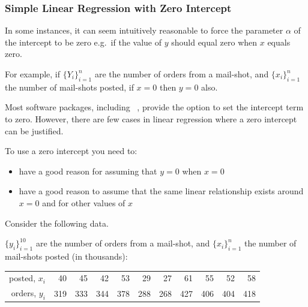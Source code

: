 \documentclass[12pt,a4paper,openany,twoside]{report}
\theoremstyle{definition}
\theoremstyle{remark}
\theoremstyle{plain}
\newcommand{\vsps}{\vspace{.5cm}}
\newcommand{\sR}[1]{\textbf{R}\,}
\theoremstyle{definition}
\theoremstyle{definition}
\theoremstyle{definition}
\theoremstyle{remark}
\let\BeginKnitrBlock\begin \let\EndKnitrBlock\end
\begin{document}
\hypertarget{simple-linear-regression-with-zero-intercept}{%
\subsubsection*{Simple Linear Regression with Zero Intercept}\label{simple-linear-regression-with-zero-intercept}}

In some instances, it can seem intuitively reasonable to force the
parameter \(\alpha\) of the intercept to be zero e.g.~if the value
of \(y\) should equal zero when \(x\) equals zero.

For example, if
\(\{ Y_{i}\}_{i = 1}^{n}\) are the number of orders from
a mail-shot, and \(\{ x_{i}\}_{i = 1}^{n}\) the number of
mail-shots posted, if \(x = 0\) then \(y = 0\) also.

Most software packages, including \sR~,
provide the option to set the intercept term to zero.
However, there are few cases in linear regression where a zero intercept
can be justified.

To use a zero intercept you need to:

\begin{itemize}
\item
  have a good reason for assuming that \(y = 0\) when \(x = 0\)
\item
  have a good reason to assume that the same linear relationship exists
  around \(x = 0\) and for other values of \(x\)\newline
\end{itemize}

\BeginKnitrBlock{example}[Mail-shot data]
\protect\hypertarget{exm:mailshot}{}{\label{exm:mailshot} {} }Consider the following data.

\(\{y_{i}\}_{i = 1}^{10}\) are the number of orders from a mail-shot, and \(\{x_{i}\}_{i = 1}^{n}\) the number of mail-shots posted (in thousands):\newline

\begin{center}
\begin{tabular}{rrrrrrrrrrr}
  \toprule
  posted, $x_i$ & 40 & 45 & 42 & 53 & 29 & 27 & 61 & 55 & 52 & 58 \\ 
orders, $y_i$ & 319 & 333 & 344 & 378 & 288 & 268 & 427 & 406 & 404 & 418 \\ 
   \bottomrule
\end{tabular}
\end{center}
\EndKnitrBlock{example}
\vsps
\end{document}
